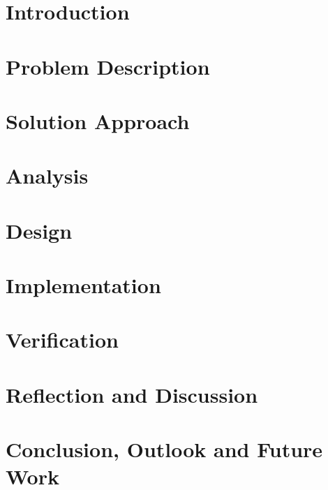 
\section{Introduction} \label{sec:intro}


\section{Problem Description} \label{sec:probdesc}


\section{Solution Approach} \label{sec:solapp}


%

\section{Analysis} \label{sec:analysis}


\section{Design} \label{sec:design}


\section{Implementation} \label{sec:impl}


\section{Verification} \label{sec:verif}


\section{Reflection and Discussion} \label{sec:reflect}


\section{Conclusion, Outlook and Future Work} \label{sec:conclusion}



\nocite{*}

\label{sec:ref}
\label{EndOfMainMatter}
\newpage

